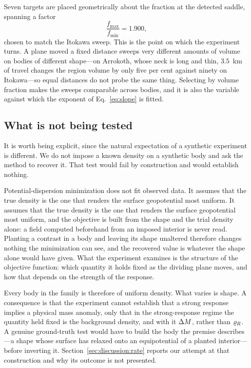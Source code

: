 Seven targets are placed geometrically about the fraction at the detected
saddle, spanning a factor
\begin{equation}
\frac{f_{\max}}{f_{\min}} = 1.900 ,
\label{eq:appspan}
\end{equation}
chosen to match the Itokawa sweep. This is the point on which the experiment
turns. A plane moved a fixed distance sweeps very different amounts of volume
on bodies of different shape---on Arrokoth, whose neck is long and thin,
$3.5$~km of travel changes the region volume by only five per cent against
ninety on Itokawa---so equal distances do not probe the same thing. Selecting
by volume fraction makes the sweeps comparable across bodies, and it is also
the variable against which the exponent of Eq.~\eqref{eq:slope} is fitted.

\subsection{What is not being tested}
\label{app:synth:not}

It is worth being explicit, since the natural expectation of a synthetic
experiment is different. We do not impose a known density on a synthetic body
and ask the method to recover it. That test would fail by construction and
would establish nothing.

Potential-dispersion minimization does not fit observed data. It assumes that
the true density is the one that renders the surface geopotential most uniform.
It assumes that the true density is the one that renders the surface
geopotential most uniform, and the objective is built from the shape and the
trial density alone: a field computed beforehand from an imposed interior is
never read. Planting a contrast in a body and leaving its shape unaltered
therefore changes nothing the minimization can see, and the recovered value is
whatever the shape alone would have given. What the experiment examines
is the structure of the objective function: which quantity it holds fixed as
the dividing plane moves, and how that depends on the strength of the response.

Every body in the family is therefore of uniform density. What varies is shape.
A consequence is that the experiment cannot establish that a strong response
implies a physical mass anomaly, only that in the strong-response regime the
quantity held fixed is the background density, and with it $\Delta M$, rather
than $\varrho_{R}$. A genuine ground-truth test would have to build the body the
premise describes---a shape whose surface has relaxed onto an equipotential of
a planted interior---before inverting it.
Section~\ref{sec:discussion:rate} reports our attempt at that construction and
why its outcome is not presented.

